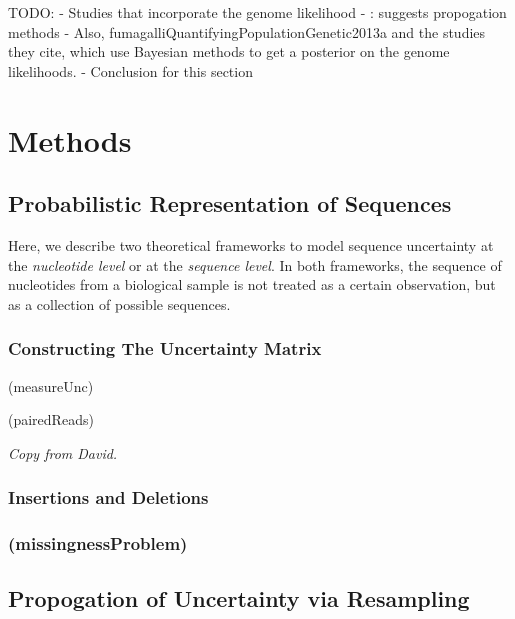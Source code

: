 \documentclass[]{article}
\begin{document}
TODO: - Studies that incorporate the genome likelihood -
\citet{oraweAccountingUncertaintyDNA2015}: suggests propogation methods
- Also, fumagalliQuantifyingPopulationGenetic2013a and the studies they
cite, which use Bayesian methods to get a posterior on the genome
likelihoods. - Conclusion for this section

\hypertarget{methods}{%
\section{Methods}\label{methods}}

\hypertarget{probabilistic-representation-of-sequences}{%
\subsection{Probabilistic Representation of
Sequences}\label{probabilistic-representation-of-sequences}}

Here, we describe two theoretical frameworks to model sequence
uncertainty at the \emph{nucleotide level} or at the
\emph{sequence level}. In both frameworks, the sequence of nucleotides
from a biological sample is not treated as a certain observation, but as
a collection of possible sequences.

\hypertarget{constructing-the-uncertainty-matrix}{%
\subsubsection{Constructing The Uncertainty
Matrix}\label{constructing-the-uncertainty-matrix}}

(measureUnc)

(pairedReads)

\emph{Copy from David.}

\hypertarget{insertions-and-deletions}{%
\subsubsection{Insertions and
Deletions}\label{insertions-and-deletions}}

\hypertarget{missingnessproblem}{%
\subsubsection{(missingnessProblem)}\label{missingnessproblem}}

\hypertarget{propogation-of-uncertainty-via-resampling}{%
\subsection{Propogation of Uncertainty via
Resampling}\label{propogation-of-uncertainty-via-resampling}}
\end{document}
